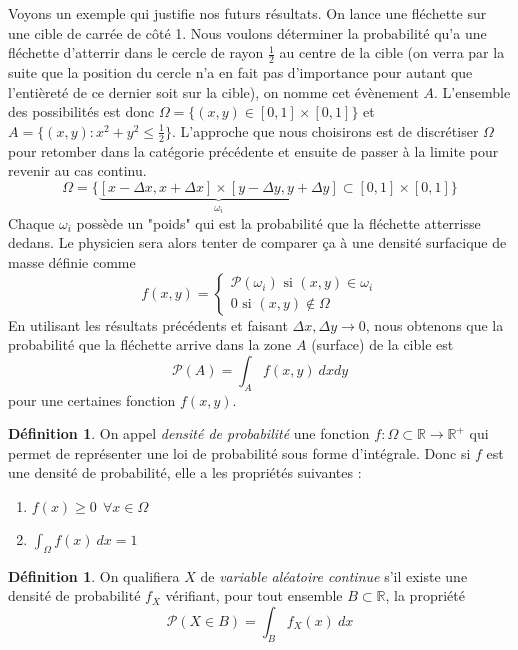 \documentclass[a4paper,12pt]{report}
\theoremstyle{definition}
\newcommand{\ra}{\rightarrow}
\newcommand{\R}{\mathbb{R}}
\renewcommand{\(}{\left(}
\renewcommand{\)}{\right)}
\renewcommand{\P}{\mathcal{P}}
\renewcommand{\t}{\text}
\renewcommand{\d}{\textit}
\newtheorem{defn}[thm]{Définition}
\begin{document}
        Voyons un exemple qui justifie nos futurs résultats. On lance une fléchette sur une cible de carrée de côté 1. Nous voulons déterminer la probabilité qu'a une fléchette d'atterrir dans le cercle de rayon $\frac{1}{2}$ au centre de la cible (on verra par la suite que la position du cercle n'a en fait pas d'importance pour autant que l'entièreté de ce dernier soit sur la cible), on nomme cet évènement $A$. L'ensemble des possibilités est donc $\Omega = \{ (x,y)\in[0,1]\times[0,1] \}$ et $A = \{ (x,y) : x^2+y^2\le \frac{1}{2} \}$. L'approche que nous choisirons est de discrétiser $\Omega$ pour retomber dans la catégorie précédente et ensuite de passer à la limite pour revenir au cas continu.
        $$\Omega = \{\underbrace{[x-\Delta x,x+\Delta x]\times[y-\Delta y,y+\Delta y]}_{\omega_i}\subset [0,1]\times[0,1] \}$$
        Chaque $\omega_i$ possède un "poids" qui est la probabilité que la fléchette atterrisse dedans. Le physicien sera alors tenter de comparer ça à une densité surfacique de masse définie comme 
        $$f(x,y) =
        \begin{cases} 
        \P(\omega_i) \t{ si } (x,y)\in\omega_i\\
        0 \t{ si } (x,y) \notin \Omega
        \end{cases}$$
        En utilisant les résultats précédents et faisant $\Delta x,\Delta y \ra 0$, nous obtenons que la probabilité que la fléchette arrive dans la zone $A$ (surface) de la cible est
        $$\displaystyle{\P(A) = \int_A f(x,y)~dxdy}$$
        pour une certaines fonction $f(x,y)$.
        
        \begin{leftbar}
        \begin{defn}
        On appel \d{densité de probabilité} une fonction $f:\Omega\subset\R \ra \R^{+}$ qui permet de représenter une loi de probabilité sous forme d'intégrale. Donc si $f$ est une densité de probabilité, elle a les propriétés suivantes :
            \begin{enumerate}[label=(\roman*)]
                \item $\displaystyle{f(x) \geq 0 ~~\forall x\in\Omega}$
                \item $\displaystyle{\int_\Omega f(x)~dx = 1}$ 
            \end{enumerate}
        \end{defn}
        \end{leftbar}
        
        \begin{leftbar}
            \begin{defn}
                On qualifiera $X$ de \textit{variable aléatoire continue} s'il existe une densité de probabilité $f_X$ vérifiant, pour tout ensemble $B \subset \R$, la propriété
                $$\P(X \in B) = \int_B f_X(x) ~dx$$
            \end{defn}
        \end{leftbar}
        
\end{document}
